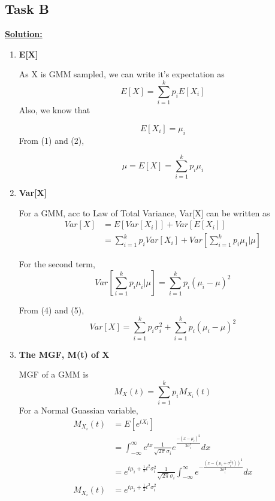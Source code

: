 \documentclass[12pt]{article}
\begin{document}
\subsection{Task B}
\textbf{\underline{Solution:}}
\begin{enumerate}
    \item \textbf{E[X]}
    
As X is GMM sampled, we can write it’s expectation as
\begin{equation}
    E[X] = \sum_{i=1}^{k} p_iE[X_i]
\end{equation}
Also, we know that 

\begin{equation}
    E[X_i] = \mu_i
\end{equation}
From (1) and (2),

\begin{equation}
   \mu = E[X] = \sum_{i=1}^{k} p_i\mu_i
\end{equation}
    \item \textbf{Var[X]}

For a GMM, acc to Law of Total Variance, Var[X] can be written as
\begin{equation}
\begin{split}
    Var[X]& = E[Var[X_i]] + Var[E[X_i]] \\
    & = \sum_{i=1}^{k} p_iVar[X_i] + Var[\sum_{i=1}^{k} p_i\mu_1|\mu]
\end{split}
\end{equation}

For the second term, 
\begin{equation}
    Var[\sum_{i=1}^{k} p_i\mu_i|\mu] = \sum_{i=1}^{k}p_i(\mu_i - \mu)^2
\end{equation}

From (4) and (5),
\begin{equation}
    Var[X] = \sum_{i=1}^{k} p_i\sigma_i^2 + \sum_{i=1}^{k}p_i(\mu_i - \mu)^2
\end{equation}

    \item \textbf{The MGF, M(t) of X}

MGF of a GMM is
\begin{equation}
    M_X(t) = \sum_{i=1}^{k} p_iM_{X_i}(t)
\end{equation}
For a Normal Guassian variable,
\begin{equation}
\begin{split}
    M_{X_i}(t)& = E[e^{tX_i}] \\
    & = \int_{-\infty}^{\infty} e^{tx} \frac{1}{\sqrt{2\pi}\sigma_i}e^{\frac{-(x-\mu_i)^2}{2\sigma_i^2}}dx \\
    & = e^{t\mu_i + \frac{1}{2}t^2\sigma_i^2}\frac{1}{\sqrt{2\pi}\sigma_i} \int_{-\infty}^{\infty} e^{-\frac{(x-(\mu_i+\sigma_i^2t))^2}{2\sigma_i^2}}dx \\
    M_{X_i}(t)& = e^{t\mu_i + \frac{1}{2}t^2\sigma_i^2}
\end{split}
\end{equation} 


\end{enumerate}
\end{document}

